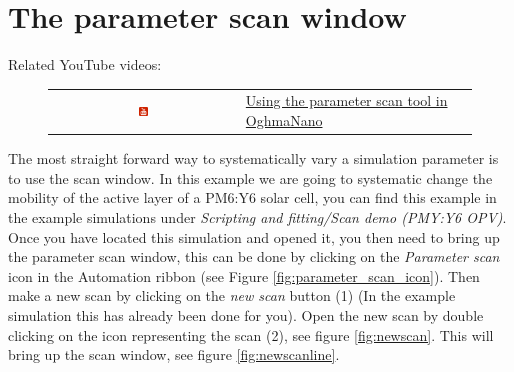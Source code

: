 \section{The parameter scan window}
\label{sec:scanwindow}
Related YouTube videos:
\begin{figure}[H]
\begin{tabular}{ c l }
\includegraphics[width=0.05\textwidth]{./images/youtube.png}
&
\href{https://www.youtube.com/watch?v=cpkPht-CKeE}{Using the parameter scan tool in OghmaNano}
\end{tabular}
\end{figure}

\vspace{0pt}
\noindent
\begin{minipage}{0.5\textwidth}
The most straight forward way to systematically vary a simulation parameter is to use the scan window. In this example we are going to systematic change the mobility of the active layer of a PM6:Y6 solar cell, you can find this example in the example simulations under \emph{Scripting and fitting/Scan demo (PMY:Y6 OPV)}. Once you have located this simulation and opened it, you then need to bring up the parameter scan window, this can be done by clicking on the \emph{Parameter scan} icon in the Automation ribbon (see Figure \ref{fig:parameter_scan_icon}).  Then make a new scan by clicking on the \emph{new scan} button (1) (In the example simulation this has already been done for you). Open the new scan by double clicking on the icon representing the scan (2), see figure \ref{fig:newscan}. This will bring up the scan window, see figure \ref{fig:newscanline}.
\end{minipage}%
\hspace{4pt}
